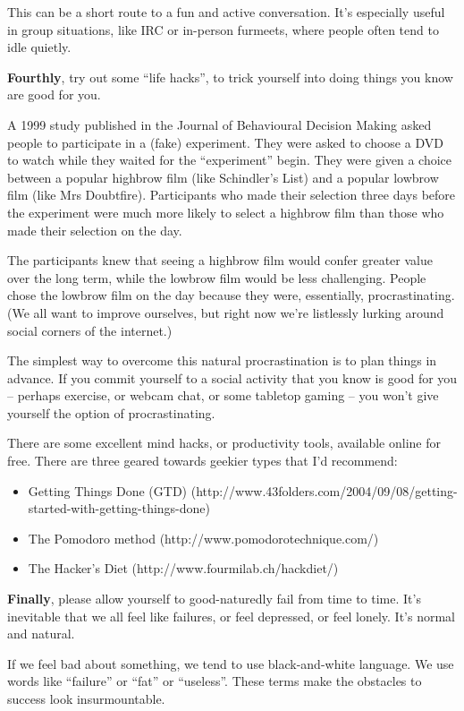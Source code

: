 This can be a short route to a fun and active conversation. It's especially useful in group situations, like IRC or in-person furmeets, where people often tend to idle quietly.

\textbf{Fourthly}, try out some ``life hacks'', to trick yourself into doing things you know are good for you.

A 1999 study published in the Journal of Behavioural Decision Making asked people to participate in a (fake) experiment. They were asked to choose a DVD to watch while they waited for the ``experiment'' begin. They were given a choice between a popular highbrow film (like Schindler's List) and a popular lowbrow film (like Mrs Doubtfire). Participants who made their selection three days before the experiment were much more likely to select a highbrow film than those who made their selection on the day.

The participants knew that seeing a highbrow film would confer greater value over the long term, while the lowbrow film would be less challenging. People chose the lowbrow film on the day because they were, essentially, procrastinating. (We all want to improve ourselves, but right now we're listlessly lurking around social corners of the internet.)

The simplest way to overcome this natural procrastination is to plan things in advance. If you commit yourself to a social activity that you know is good for you -- perhaps exercise, or webcam chat, or some tabletop gaming -- you won't give yourself the option of procrastinating.

There are some excellent mind hacks, or productivity tools, available online for free. There are three geared towards geekier types that I'd recommend:

\begin{itemize}
  \item Getting Things Done (GTD) (http://www.43folders.com/2004/09/08/getting-started-with-getting-things-done)
  \item The Pomodoro method (http://www.pomodorotechnique.com/)
  \item The Hacker's Diet (http://www.fourmilab.ch/hackdiet/)
\end{itemize}

\textbf{Finally}, please allow yourself to good-naturedly fail from time to time. It's inevitable that we all feel like failures, or feel depressed, or feel lonely. It's normal and natural.

If we feel bad about something, we tend to use black-and-white language. We use words like ``failure'' or ``fat'' or ``useless''. These terms make the obstacles to success look insurmountable.

